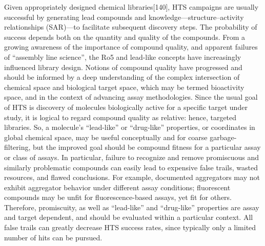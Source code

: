 Given appropriately designed chemical libraries[140], HTS campaigns are usually successful by generating lead compounds and knowledge—structure–activity relationships (SAR)—to facilitate subsequent discovery steps. The probability of success depends both on the quantity and quality of the compounds. From a growing awareness of the importance of compound quality, and apparent failures of “assembly line science”, the Ro5 and lead-like concepts have increasingly influenced library design. Notions of compound quality have progressed and should be informed by a deep understanding of the complex intersection of chemical space and biological target space, which may be termed bioactivity space, and in the context of advancing assay methodologies. Since the usual goal of HTS is discovery of molecules biologically active for a specific target under study, it is logical to regard compound quality as relative: hence, targeted libraries. So, a molecule’s “lead-like” or “drug-like” properties, or coordinates in global chemical space, may be useful conceptually and for coarse garbage-filtering, but the improved goal should be compound fitness for a particular assay or class of assays. In particular, failure to recognize and remove promiscuous and similarly problematic compounds can easily lead to expensive false trails, wasted resources, and flawed conclusions. For example, documented aggregators may not exhibit aggregator behavior under different assay conditions; fluorescent compounds may be unfit for fluorescence-based assays, yet fit for others. Therefore, promiscuity, as well as “lead-like” and “drug-like” properties are assay and target dependent, and should be evaluated within a particular context. All false trails can greatly decrease HTS success rates, since typically only a limited number of hits can be pursued.

